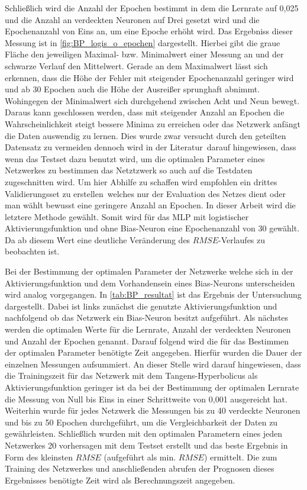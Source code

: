 Schließlich wird die Anzahl der Epochen bestimmt in dem die Lernrate auf 0,025 und die Anzahl an verdeckten Neuronen auf Drei gesetzt wird und die Epochenanzahl von Eins an, um eine Epoche erhöht wird. Das Ergebniss dieser Messung ist in \autoref{fig:BP_logis_o_epochen} dargestellt. Hierbei gibt die graue Fläche den jeweiligen Maximal- bzw. Minimalwert einer Messung an und der schwarze Verlauf den Mittelwert. Gerade an dem Maximalwert lässt sich erkennen, dass die Höhe der Fehler mit steigender Epochenanzahl geringer wird und ab 30 Epochen auch die Höhe der Ausreißer sprunghaft abnimmt. Wohingegen der Minimalwert sich durchgehend zwischen Acht und Neun bewegt. Daraus kann geschlossen werden, dass mit steigender Anzahl an Epochen die Wahrscheinlichkeit steigt bessere Minima zu erreichen oder das Netzwerk anfängt die Daten auswendig zu lernen. Dies wurde zwar versucht durch den geteilten Datensatz zu vermeiden dennoch wird in der Literatur\, darauf hingewiesen, dass wenn das Testset dazu benutzt wird, um die optimalen Parameter eines Netzwerkes zu bestimmen das Netztzwerk so auch auf die Testdaten zugeschnitten wird. Um hier Abhilfe zu schaffen wird empfohlen ein drittes Validierungsset zu erstellen\, welches nur der Evaluation des Netzes dient oder man wählt bewusst eine geringere Anzahl an Epochen. In dieser Arbeit wird die letztere Methode gewählt. Somit wird für das MLP mit logistischer Aktivierungsfunktion und ohne Bias-Neuron eine Epochenanzahl von 30 gewählt. Da ab diesem Wert eine deutliche Veränderung des $RMSE$-Verlaufes zu beobachten ist.

Bei der Bestimmung der optimalen Parameter der Netzwerke welche sich in der Aktivierungsfunktion und dem Vorhandensein eines Bias-Neurons unterscheiden wird analog vorgegangen.
In \autoref{tab:BP_resultat} ist das Ergebnis der Untersuchung dargestellt. Dabei ist links zunächst die genutzte Aktivierungsfunktion und nachfolgend ob das Netzwerk ein Bias-Neuron besitzt aufgeführt. Als nächstes werden die optimalen Werte für die Lernrate, Anzahl der verdeckten Neuronen und Anzahl der Epochen genannt. Darauf folgend wird die für das Bestimmen der optimalen Parameter benötigte Zeit angegeben. Hierfür wurden die Dauer der einzelnen Messungen aufsummiert. An dieser Stelle wird darauf hingewiesen, dass die Trainingszeit für das Netzwerk mit dem Tangens-Hyperbolicus als Aktivierungsfunktion geringer ist da bei der Bestimmung der optimalen Lernrate die Messung von Null bis Eins in einer Schrittweite von 0,001 ausgereicht hat. Weiterhin wurde für jedes Netzwerk die Messungen bis zu 40 verdeckte Neuronen und bis zu 50 Epochen durchgeführt, um die Vergleichbarkeit der Daten zu gewährleisten. Schließlich wurden mit den optimalen Parametern eines jeden Netzwerkes 20 vorhersagen mit dem Testset erstellt und das beste Ergebnis in Form des kleinsten $RMSE$ (aufgeführt als min. $RMSE$) ermittelt. Die zum Training des Netzwerkes und anschließenden abrufen der Prognosen dieses Ergebnisses benötigte Zeit wird als Berechnungszeit angegeben.

